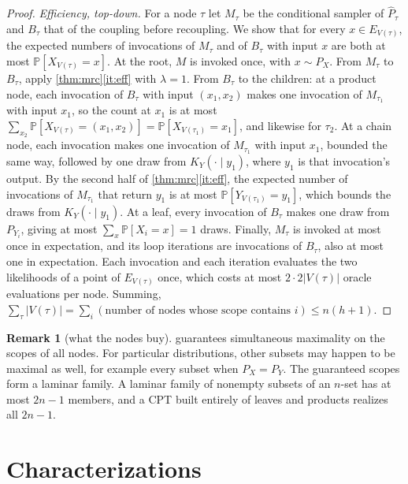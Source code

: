 \documentclass[11pt]{article}
\theoremstyle{definition}
\newtheorem{remark}[theorem]{Remark}
\newcommand{\hP}{\hat P}
\newcommand{\Var}{V}
\renewcommand{\Pr}{\mathbb{P}}
\begin{document}
\begin{proof}
\emph{Efficiency, top-down.} For a node $\tau$ let $M_\tau$ be the conditional
sampler of $\hP_\tau$ and $B_\tau$ that of the coupling before recoupling. We
show that for every $x\in E_{\Var(\tau)}$, the expected numbers of invocations
of $M_\tau$ and of $B_\tau$ with input $x$ are both at most
$\Pr[X_{\Var(\tau)}=x]$. At the root, $M$ is invoked once, with $x\sim P_X$.
From $M_\tau$ to $B_\tau$, apply \cref{thm:mrc}\ref{it:eff} with $\lambda=1$.
From $B_\tau$ to the children: at a product node, each invocation of $B_\tau$
with input $(x_1,x_2)$ makes one invocation of $M_{\tau_1}$ with input $x_1$,
so the count at $x_1$ is at most $\sum_{x_2}\Pr[X_{\Var(\tau)}=(x_1,x_2)]=\Pr[X_{\Var(\tau_1)}=x_1]$,
and likewise for $\tau_2$. At a chain node, each invocation makes one
invocation of $M_{\tau_1}$ with input $x_1$, bounded the same way, followed by
one draw from $K_Y(\cdot\mid y_1)$, where $y_1$ is that invocation's output. By
the second half of \cref{thm:mrc}\ref{it:eff}, the expected number of
invocations of $M_{\tau_1}$ that return $y_1$ is at most
$\Pr[Y_{\Var(\tau_1)}=y_1]$, which bounds the draws from
$K_Y(\cdot\mid y_1)$. At a leaf, every invocation of $B_\tau$ makes one draw
from $P_{Y_i}$, giving at most $\sum_x\Pr[X_i=x]=1$ draws. Finally, $M_\tau$ is
invoked at most once in expectation, and its loop iterations are invocations
of $B_\tau$, also at most one in expectation. Each invocation and each
iteration evaluates the two likelihoods of a point of $E_{\Var(\tau)}$ once,
which costs at most $2\cdot2|\Var(\tau)|$ oracle evaluations per node. Summing,
$\sum_\tau|\Var(\tau)|=\sum_{i}(\text{number of nodes whose scope contains }i)\le n(h+1)$.
\end{proof}

\begin{remark}[what the nodes buy]
 guarantees simultaneous maximality on the scopes of all nodes.
For particular distributions, other subsets may happen to be maximal as well, for
example every subset when $P_X=P_Y$. The guaranteed scopes form a laminar
family. A laminar family of
nonempty subsets of an $n$-set has at most $2n-1$ members, and a CPT built
entirely of leaves and products realizes all $2n-1$.
\end{remark}

\section{Characterizations}\label{sec:characterization}
\end{document}
